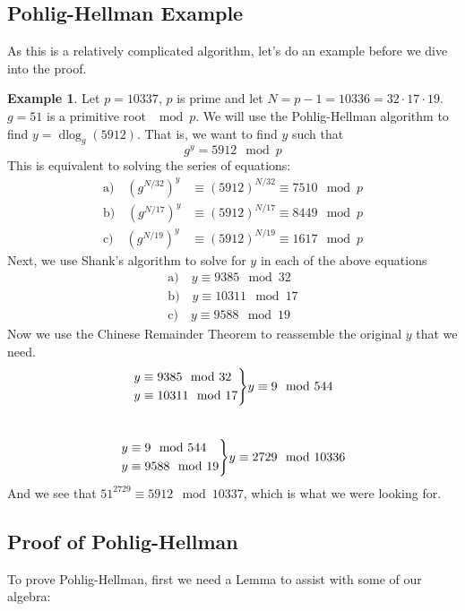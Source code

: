 \documentclass[10pt]{article}
\theoremstyle{definition}
\newtheorem{ex}[theorem]{Example}
\theoremstyle{remark}
\DeclareMathOperator{\dlog}{dlog}
\newenvironment{rcases}
  {\left.\begin{aligned}}
  {\end{aligned}\right\rbrace}
\begin{document}
\subsection{Pohlig-Hellman Example}
As this is a relatively complicated algorithm, let's do an example before we dive into the proof.
\begin{ex}
Let $p = 10337$, $p$ is prime and let $N = p-1 = 10336 = 32 \cdot 17 \cdot 19$.  $g = 51$ is a primitive root $\mod p$.  We will use the Pohlig-Hellman algorithm to find $y = \dlog_g(5912)$.  That is, we want to find $y$ such that $$g^y = 5912 \mod p$$
This is equivalent to solving the series of equations:
\begin{align*}
\text{a)}\quad(g^{N/32})^y &\equiv (5912)^{N/32} \equiv 7510 \mod p \\
\text{b)}\quad(g^{N/17})^y &\equiv (5912)^{N/17} \equiv 8449 \mod p \\
\text{c)}\quad(g^{N/19})^y &\equiv (5912)^{N/19} \equiv 1617 \mod p
\end{align*}
Next, we use Shank's algorithm to solve for $y$ in each of the above equations
\begin{align*}
\text{a)}\quad y \equiv 9385 \mod 32 \\
\text{b)}\quad y \equiv 10311 \mod 17 \\
\text{c)}\quad y \equiv 9588 \mod 19
\end{align*}
Now we use the Chinese Remainder Theorem to reassemble the original $y$ that we need.
\begin{equation*}
\begin{rcases}
  y &\equiv 9385 \mod 32 \\
  y &\equiv 10311 \mod 17
\end{rcases}
y \equiv 9 \mod 544
\end{equation*}\\
\begin{equation*}
\begin{rcases}
  y &\equiv 9 \mod 544 \\
  y &\equiv 9588 \mod 19
\end{rcases}
y \equiv 2729 \mod 10336
\end{equation*}
And we see that $51^{2729} \equiv 5912 \mod 10337$, which is what we were looking for.
\end{ex}
\subsection{Proof of Pohlig-Hellman}
To prove Pohlig-Hellman, first we need a Lemma to assist with some of our algebra:
\end{document}
